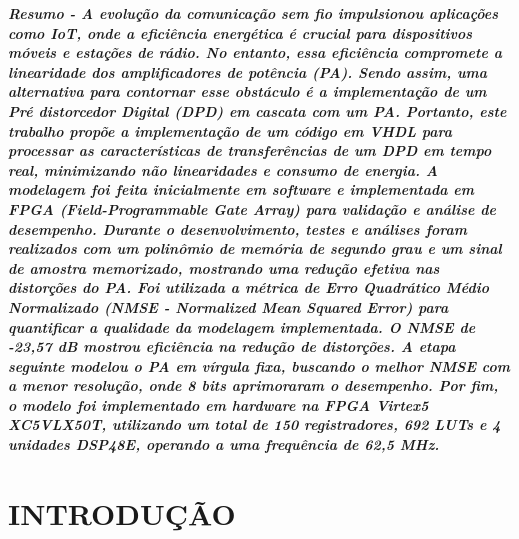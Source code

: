 \documentclass[twocolumn, a4paper]{article}
\begin{document}
\begin{strip}
	\vspace*{\dimexpr-\baselineskip-\stripsep\relax}
	\maketitle
	\vskip\baselineskip
	\noindent %
	\vskip\baselineskip
\end{strip}
\thispagestyle{specialfooter}
\vspace{3pt}\textbf{\textit{Resumo - A evolução da comunicação sem fio impulsionou aplicações como IoT, onde a eficiência energética é crucial para dispositivos móveis e estações de rádio. No entanto, essa eficiência compromete a linearidade dos amplificadores de potência (PA). Sendo assim, uma alternativa para contornar esse obstáculo é a implementação de um Pré distorcedor Digital (DPD) em cascata com um PA. Portanto, este trabalho propõe a implementação de um código em VHDL para processar as características de transferências de um DPD em tempo real, minimizando não linearidades e consumo de energia. A modelagem foi feita inicialmente em software e implementada em FPGA (Field-Programmable Gate Array) para validação e análise de desempenho. Durante o desenvolvimento, testes e análises foram realizados com um polinômio de memória de segundo grau e um sinal de amostra memorizado, mostrando uma redução efetiva nas distorções do PA. Foi utilizada a métrica de Erro Quadrático Médio Normalizado (NMSE - \textit{Normalized Mean Squared Error}) para quantificar a qualidade da modelagem implementada. O NMSE de -23,57 dB mostrou eficiência na redução de distorções. A etapa seguinte modelou o PA em vírgula fixa, buscando o melhor NMSE com a menor resolução, onde 8 bits aprimoraram o desempenho. Por fim, o modelo foi implementado em hardware na FPGA Virtex5 XC5VLX50T, utilizando um total de 150 registradores, 692 LUTs e 4 unidades DSP48E, operando a uma frequência de 62,5 MHz.}}

\section{INTRODUÇÃO}

\end{document}
